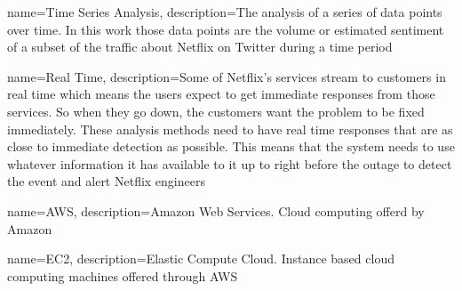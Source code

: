 \documentclass[12pt]{ucthesis}
\begin{document}




      {name={Time Series Analysis},
       description={The analysis of a series of data points over time. In this work those data
                    points are the volume or estimated sentiment of a subset of the traffic about
                    Netflix on Twitter during a time period}}

      {name={Real Time},
       description={Some of Netflix's services stream to customers in real time which means the
                    users expect to get immediate responses from those services. So when
                    they go down, the customers want the problem to be fixed immediately. These
                    analysis methods need to have real time responses that are as close to
                    immediate detection as possible. This means that the system needs to use
                    whatever information it has available to it up to right before the outage to
                    detect the event and alert Netflix engineers}}

      {name={AWS},
       description={Amazon Web Services. Cloud computing offerd by Amazon}}

      {name={EC2},
       description={Elastic Compute Cloud. Instance based cloud computing machines offered through AWS}}

\glsaddall
{}
\printglossaries

\clearpage


\end{document}
